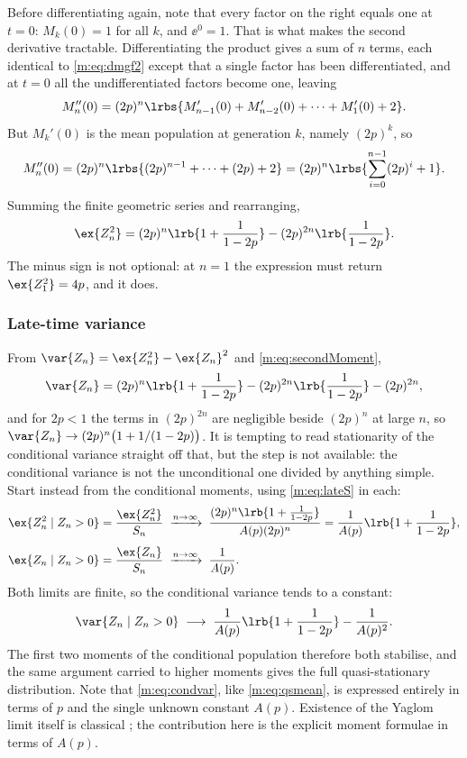 Before differentiating again, note that every factor on the right equals one at
$t=0$: $M_k(0)=1$ for all $k$, and $\ee^0=1$. That is what makes the second
derivative tractable. Differentiating the product gives a sum of $n$ terms, each
identical to \cref{m:eq:dmgf2} except that a single factor has been differentiated,
and at $t=0$ all the undifferentiated factors become one, leaving
\begin{equation*}
M_n''(0) = (2p)^n\lrbs{M_{n-1}'(0) + M_{n-2}'(0) + \cdots + M_1'(0) + 2}.
\end{equation*}
But $M_k'(0)$ is the mean population at generation $k$, namely $(2p)^k$, so
\begin{equation*}
M_n''(0) = (2p)^n\lrbs{(2p)^{n-1} + \cdots + (2p) + 2}
= (2p)^n\lrbs{\sum_{i=0}^{n-1}(2p)^i + 1}.
\end{equation*}
Summing the finite geometric series and rearranging,
\begin{equation}
\label{m:eq:secondMoment}
\ex{Z_n^2} = (2p)^n\lrb{1+\frac{1}{1-2p}} - (2p)^{2n}\lrb{\frac{1}{1-2p}} .
\end{equation}
The minus sign is not optional: at $n=1$ the expression must return
$\ex{Z_1^2}=4p$, and it does.

\subsubsection{Late-time variance}

From $\var{Z_n} = \ex{Z_n^2}-\ex{Z_n}^2$ and \cref{m:eq:secondMoment},
\begin{equation*}
\var{Z_n} = (2p)^n\lrb{1+\frac{1}{1-2p}} - (2p)^{2n}\lrb{\frac{1}{1-2p}} - (2p)^{2n},
\end{equation*}
and for $2p<1$ the terms in $(2p)^{2n}$ are negligible beside $(2p)^n$ at large
$n$, so $\var{Z_n}\to(2p)^n\bigl(1+1/(1-2p)\bigr)$. It is tempting to read
stationarity of the conditional variance straight off that, but the step is not
available: the conditional variance is not the unconditional one divided by
anything simple. Start instead from the conditional moments, using
\cref{m:eq:lateS} in each:
\begin{align*}
\ex{Z_n^2\mid Z_n>0} &= \frac{\ex{Z_n^2}}{S_n}
\;\xrightarrow{n\to\infty}\;
\frac{(2p)^n\lrb{1+\frac{1}{1-2p}}}{A(p)(2p)^n}
= \frac{1}{A(p)}\lrb{1+\frac{1}{1-2p}},\\[4pt]
\ex{Z_n\mid Z_n>0} &= \frac{\ex{Z_n}}{S_n}
\;\xrightarrow{n\to\infty}\;
\frac{1}{A(p)} .
\end{align*}
Both limits are finite, so the conditional variance tends to a constant:
\begin{equation}
\label{m:eq:condvar}
\var{Z_n\mid Z_n>0} \;\longrightarrow\;
\frac{1}{A(p)}\lrb{1+\frac{1}{1-2p}} - \frac{1}{A(p)^2} .
\end{equation}
The first two moments of the conditional population therefore both stabilise, and
the same argument carried to higher moments gives the full quasi-stationary
distribution. Note that \cref{m:eq:condvar}, like \cref{m:eq:qsmean}, is expressed
entirely in terms of $p$ and the single unknown constant $A(p)$. Existence of the
Yaglom limit itself is classical \cite{Yaglom1947}; the contribution here is the
explicit moment formulae in terms of $A(p)$.

